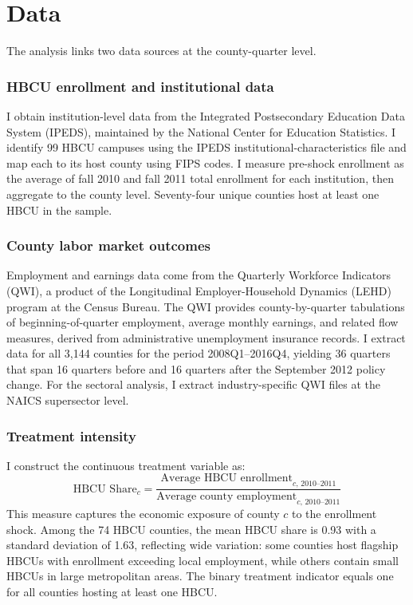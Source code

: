 \documentclass[12pt]{article}
\begin{document}
\section{Data}
\label{sec:data}

The analysis links two data sources at the county-quarter level.

\subsubsection*{HBCU enrollment and institutional data} I obtain institution-level data from the Integrated Postsecondary Education Data System (IPEDS), maintained by the National Center for Education Statistics. I identify 99 HBCU campuses using the IPEDS institutional-characteristics file and map each to its host county using FIPS codes. I measure pre-shock enrollment as the average of fall 2010 and fall 2011 total enrollment for each institution, then aggregate to the county level. Seventy-four unique counties host at least one HBCU in the sample.

\subsubsection*{County labor market outcomes} Employment and earnings data come from the Quarterly Workforce Indicators (QWI), a product of the Longitudinal Employer-Household Dynamics (LEHD) program at the Census Bureau. The QWI provides county-by-quarter tabulations of beginning-of-quarter employment, average monthly earnings, and related flow measures, derived from administrative unemployment insurance records. I extract data for all 3{,}144 counties for the period 2008Q1--2016Q4, yielding 36 quarters that span 16 quarters before and 16 quarters after the September 2012 policy change. For the sectoral analysis, I extract industry-specific QWI files at the NAICS supersector level.

\subsubsection*{Treatment intensity} I construct the continuous treatment variable as:
\[
\text{HBCU Share}_c = \frac{\text{Average HBCU enrollment}_{c,\,2010\text{--}2011}}{\text{Average county employment}_{c,\,2010\text{--}2011}}
\]
This measure captures the economic exposure of county $c$ to the enrollment shock. Among the 74 HBCU counties, the mean HBCU share is 0.93 with a standard deviation of 1.63, reflecting wide variation: some counties host flagship HBCUs with enrollment exceeding local employment, while others contain small HBCUs in large metropolitan areas. The binary treatment indicator equals one for all counties hosting at least one HBCU.
\end{document}
